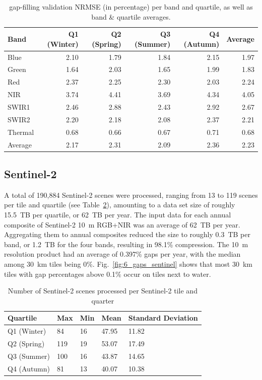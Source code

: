 \begin{table}[h!]
\centering
\caption{gap-filling validation NRMSE (in percentage) per band and quartile, as well as band \& quartile averages.}
\label{tab:results_gap-filling_nrmse}
\begin{tabular}{lrrrrr}
\hline
Band    & Q1 (Winter)  	& Q2 (Spring) 	&  Q3 (Summer) 	&  Q4 (Autumn) 	&  Average \\
\hline
Blue    &    2.10 		&    1.79 		&    1.84 		&    2.15 		&     1.97 \\
Green   &    1.64 		&    2.03 		&    1.65 		&    1.99 		&     1.83 \\
Red     &    2.37 		&    2.25 		&    2.30 		&    2.03 		&     2.24 \\
NIR     &    3.74 		&    4.41 		&    3.69 		&    4.34 		&     4.05 \\
SWIR1   &    2.46 		&    2.88 		&    2.43 		&    2.92 		&     2.67 \\
SWIR2   &    2.20 		&    2.18 		&    2.08 		&    2.37 		&     2.21 \\
Thermal &    0.68 		&    0.66 		&    0.67 		&    0.71 		&     0.68 \\
Average &    2.17 		&    2.31 		&    2.09 		&    2.36 		&     2.23 \\
\hline
\end{tabular}
\end{table}


\subsection*{Sentinel-2}

A total of 190,884 Sentinel-2 scenes were processed, ranging from 13 to 119 scenes per tile and quartile (see Table\@~\ref{tab:s2_scenes}), amounting to a data set size of roughly 15.5~TB per quartile, or 62~TB per year. The input data for each annual composite of Sentinel-2 10~m RGB+NIR was an average of 62~TB per year. Aggregating them to annual composites reduced the size to roughly 0.3~TB per band, or 1.2~TB for the four bands, resulting in 98.1\% compression. The 10~m resolution product had an average of 0.397\% gaps per year, with the median among 30~km tiles being 0\%. Fig.\@~\ref{fig:6_gaps_sentinel} shows that most 30~km tiles with gap percentages above 0.1\% occur on tiles next to water. 

\begin{table}[!hbt]
\centering
\caption{Number of Sentinel-2 scenes processed per Sentinel-2 tile and quarter}
\label{tab:s2_scenes}
\begin{tabular}{@{}lllll@{}}
\hline
Quartile & Max & Min & Mean & Standard Deviation \\ 
\hline
Q1 (Winter) & 84 & 16 & 47.95 & 11.82 \\
Q2 (Spring) & 119 & 19 & 53.07 & 17.49 \\
Q3 (Summer) & 100 & 16 & 43.87 & 14.65 \\
Q4 (Autumn) & 81 & 13 & 40.07 & 10.38 \\
\hline
\end{tabular}
\end{table}

